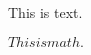 \documentclass{article}
\begin{document}
This is text.
\begin{comment}This is a comment.\end{comment}
$This is math.$
\end{document}
